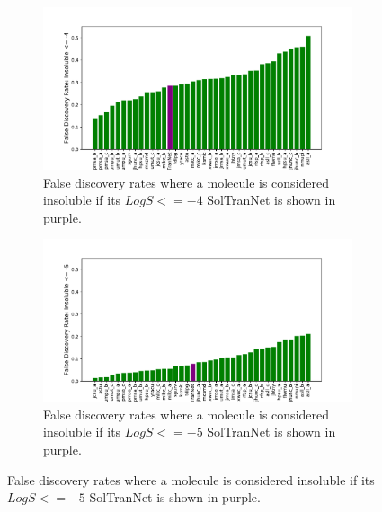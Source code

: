 \documentclass[journal=jmcmar,manuscript=article]{achemso}
\begin{document}
\begin{figure}[tb]
    \begin{subfigure}[t]{0.48\textwidth}
        \centering
        \includegraphics[width=\linewidth]{figures/fail_-4_solchal2.pdf}
        \caption{False discovery rates where a molecule is considered insoluble if its $LogS <=-4$ SolTranNet is shown in purple.}
    \end{subfigure}%
    \hfill
    \begin{subfigure}[t]{0.48\textwidth}
        \centering
        \includegraphics[width=\linewidth]{figures/fail_-5_solchal2.pdf}
        \caption{False discovery rates where a molecule is considered insoluble if its $LogS <=-5$ SolTranNet is shown in purple.}
    \end{subfigure}
    

\end{figure}
\end{document}
